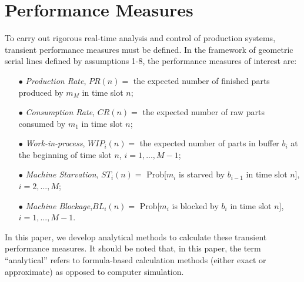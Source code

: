 \section{Performance Measures}
\label{performance measures}
\noindent To carry out rigorous real-time analysis and control of production systems, transient performance measures must be defined. In the framework of geometric serial lines defined by assumptions 1-8, the performance measures of interest are:
\begin{itemize}
    \item[$\bullet$] \textsl{Production Rate}, $PR(n) = $ the expected number of finished parts produced by $m_M$ in time slot $n$;
    \item[$\bullet$] \textsl{Consumption Rate}, $CR(n)=$ the expected number of raw parts consumed by $m_1$ in time slot $n$;
    \item[$\bullet$] \textsl{Work-in-process}, $WIP_i(n)=$ the expected number of parts in buffer $b_i$ at the beginning of time slot $n$, $i=1,...,M-1$;
    \item[$\bullet$] \textsl{Machine Starvation}, $ST_i(n)=$ Prob[$m_i$ is starved by $b_{i-1}$ in time slot $n$], $i=2,...,M$;
    \item[$\bullet$] \textsl{Machine Blockage},$ BL_i(n)=$ Prob[$m_i$ is blocked by $b_i$ in time slot $n$], $ i=1,...,M-1$.
\end{itemize}
In this paper, we develop analytical methods to calculate these transient performance measures. It should be noted that, in this paper, the term “analytical” refers to formula-based calculation methods (either exact or approximate) as opposed to computer simulation.